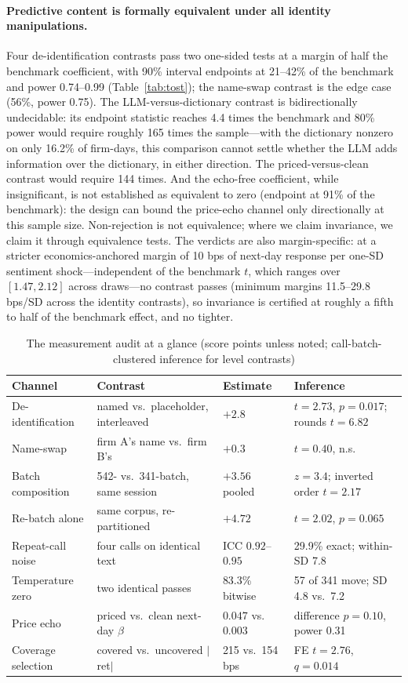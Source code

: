 \documentclass[11pt]{article}
\begin{document}
\paragraph{Predictive content is formally equivalent under all identity manipulations.}
Four de-identification contrasts pass two one-sided tests at a margin of half the benchmark coefficient, with 90\% interval endpoints at 21--42\% of the benchmark and power 0.74--0.99 (Table~\ref{tab:tost}); the name-swap contrast is the edge case (56\%, power 0.75). The LLM-versus-dictionary contrast is bidirectionally undecidable: its endpoint statistic reaches 4.4 times the benchmark and 80\% power would require roughly 165 times the sample---with the dictionary nonzero on only 16.2\% of firm-days, this comparison cannot settle whether the LLM adds information over the dictionary, in either direction. The priced-versus-clean contrast would require 144 times. And the echo-free coefficient, while insignificant, is not established as equivalent to zero (endpoint at 91\% of the benchmark): the design can bound the price-echo channel only directionally at this sample size. Non-rejection is not equivalence; where we claim invariance, we claim it through equivalence tests. The verdicts are also margin-specific: at a stricter economics-anchored margin of 10 bps of next-day response per one-SD sentiment shock---independent of the benchmark $t$, which ranges over $[1.47,2.12]$ across draws---no contrast passes (minimum margins 11.5--29.8 bps/SD across the identity contrasts), so invariance is certified at roughly a fifth to half of the benchmark effect, and no tighter.

\begin{table}[t]
\centering\small
\caption{The measurement audit at a glance (score points unless noted; call-batch-clustered inference for level contrasts)}
\label{tab:audit}
\begin{tabular}{llll}
\toprule
Channel & Contrast & Estimate & Inference \\
\midrule
De-identification & named vs.\ placeholder, interleaved & $+2.8$ & $t=2.73$, $p=0.017$; rounds $t=6.82$ \\
Name-swap & firm A's name vs.\ firm B's & $+0.3$ & $t=0.40$, n.s. \\
Batch composition & 542- vs.\ 341-batch, same session & $+3.56$ pooled & $z=3.4$; inverted order $t=2.17$ \\
Re-batch alone & same corpus, re-partitioned & $+4.72$ & $t=2.02$, $p=0.065$ \\
Repeat-call noise & four calls on identical text & ICC $0.92$--$0.95$ & 29.9\% exact; within-SD 7.8 \\
Temperature zero & two identical passes & 83.3\% bitwise & 57 of 341 move; SD 4.8 vs.\ 7.2 \\
Price echo & priced vs.\ clean next-day $\beta$ & $0.047$ vs.\ $0.003$ & difference $p=0.10$, power 0.31 \\
Coverage selection & covered vs.\ uncovered $|$ret$|$ & 215 vs.\ 154 bps & FE $t=2.76$, $q=0.014$ \\
\bottomrule
\end{tabular}
\end{table}
\end{document}
